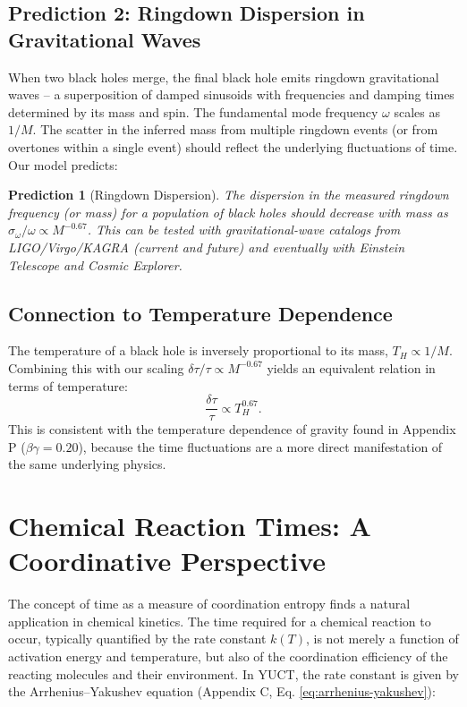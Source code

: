 \documentclass[12pt,a4paper]{article}
\newtheorem{prediction}[theorem]{Prediction}
\begin{document}
	\subsection{Prediction 2: Ringdown Dispersion in Gravitational Waves}
	
	When two black holes merge, the final black hole emits ringdown gravitational waves – a superposition of damped sinusoids with frequencies and damping times determined by its mass and spin. The fundamental mode frequency \(\omega\) scales as \(1/M\). The scatter in the inferred mass from multiple ringdown events (or from overtones within a single event) should reflect the underlying fluctuations of time. Our model predicts:
	\begin{prediction}[Ringdown Dispersion]
		The dispersion in the measured ringdown frequency (or mass) for a population of black holes should decrease with mass as \(\sigma_{\omega}/\omega \propto M^{-0.67}\). This can be tested with gravitational-wave catalogs from LIGO/Virgo/KAGRA (current and future) and eventually with Einstein Telescope and Cosmic Explorer.
	\end{prediction}
	
	\subsection{Connection to Temperature Dependence}
	
	The temperature of a black hole is inversely proportional to its mass, \(T_H \propto 1/M\). Combining this with our scaling \(\delta\tau/\tau \propto M^{-0.67}\) yields an equivalent relation in terms of temperature:
	\begin{equation}
		\frac{\delta\tau}{\tau} \propto T_H^{0.67}.
	\end{equation}
	This is consistent with the temperature dependence of gravity found in Appendix P (\(\beta\gamma = 0.20\)), because the time fluctuations are a more direct manifestation of the same underlying physics.
	
	\section{Chemical Reaction Times: A Coordinative Perspective}
	\label{sec:chemistry}
	
	The concept of time as a measure of coordination entropy finds a natural application in chemical kinetics. The time required for a chemical reaction to occur, typically quantified by the rate constant \(k(T)\), is not merely a function of activation energy and temperature, but also of the coordination efficiency of the reacting molecules and their environment. In YUCT, the rate constant is given by the Arrhenius–Yakushev equation (Appendix C, Eq. \ref{eq:arrhenius-yakushev}):
	
\end{document}
